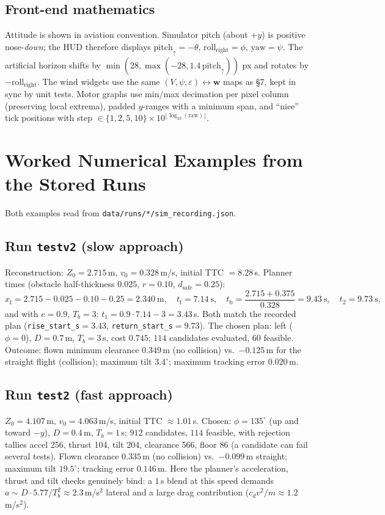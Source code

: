 \documentclass[11pt,a4paper]{article}
\newcommand{\vc}[1]{\bm{#1}}
\newcommand{\code}[1]{\texttt{\small #1}}
\begin{document}
\subsection{Front-end mathematics}
Attitude is shown in aviation convention. Simulator pitch (about $+y$) is positive nose-\emph{down}; the HUD therefore displays $\text{pitch}_{\uparrow}=-\theta$, $\text{roll}_{\text{right}}=\phi$, $\text{yaw}=\psi$.
The artificial horizon shifts by $\min(28,\max(-28,1.4\,\text{pitch}_\uparrow))$ px and rotates by $-\text{roll}_{\text{right}}$. The wind widgets use the same $(V,\psi,\varepsilon)\leftrightarrow\vc w$ maps as \S7, kept in sync by unit tests. Motor graphs use min/max decimation per pixel column
(preserving local extrema), padded $y$-ranges with a minimum span, and ``nice'' tick positions with step $\in\{1,2,5,10\}\times10^{\lfloor\log_{10}(\text{raw})\rfloor}$.

\section{Worked Numerical Examples from the Stored Runs}
Both examples read from \code{data/runs/*/sim_recording.json}.

\subsection{Run \code{testv2} (slow approach)}
Reconstruction: $Z_0=2.715$\,m, $v_0=0.328$\,m/s, initial TTC $=8.28$\,s. Planner times (obstacle half-thickness $0.025$, $r=0.10$, $d_{\text{safe}}=0.25$):
\[
x_{\text{f}}=2.715-0.025-0.10-0.25=2.340\ \text{m},\quad t_{\text{f}}=7.14\ \text{s},\quad t_{\text{b}}=\frac{2.715+0.375}{0.328}=9.43\ \text{s},\quad t_2=9.73\ \text{s},
\]
and with $e=0.9$, $T_b=3$: $t_1=0.9\cdot7.14-3=3.43$\,s. Both match the recorded plan (\code{rise\_start\_s}$=3.43$, \code{return\_start\_s}$=9.73$).
The chosen plan: left ($\phi=0$), $D=0.7$\,m, $T_b=3$\,s, cost $0.745$; $114$ candidates evaluated, $60$ feasible.
Outcome: flown minimum clearance $0.349$\,m (no collision) vs.\ $-0.125$\,m for the straight flight (collision); maximum tilt $3.4^\circ$; maximum tracking error $0.020$\,m.

\subsection{Run \code{test2} (fast approach)}
$Z_0=4.107$\,m, $v_0=4.063$\,m/s, initial TTC $\approx1.01$\,s. Chosen: $\phi=135^\circ$ (up and toward $-y$), $D=0.4$\,m, $T_b=1$\,s; $912$ candidates, $114$ feasible, with rejection tallies accel 256, thrust 104, tilt 204, clearance 566, floor 86 (a candidate can fail several tests).
Flown clearance $0.335$\,m (no collision) vs.\ $-0.099$\,m straight; maximum tilt $19.5^\circ$; tracking error $0.146$\,m. Here the planner's acceleration, thrust and tilt checks genuinely bind: a $1$\,s blend at this speed demands
$a\sim D\cdot5.77/T_b^2\approx2.3$\,m/s$^2$ lateral and a large drag contribution ($c_dv^2/m\approx1.2$\,m/s$^2$).
\end{document}
